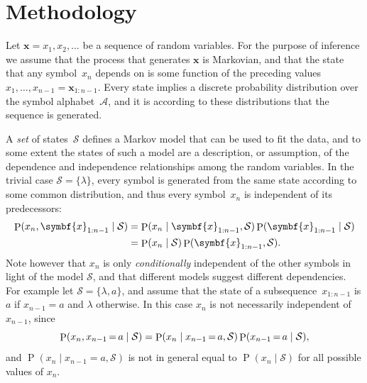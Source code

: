 \documentclass[12pt,a4paper]{article}
\newcommand\mc[1]{\mathcal{#1}}               %
\newcommand\ub[1]{\symbf{#1}}                 %
\DeclareMathOperator\Pb{P}                    %
\DeclarePairedDelimiter\lr{\lparen}{\rparen}  %
\newcommand\peq{\mathop{=}}   %
\begin{document}
\section{Methodology} %

Let \(\ub{x} = x_1, x_2, \dotsc\) be a sequence of random variables. For the
purpose of inference we assume that the process that generates \(\ub{x}\) is
Markovian, and that the state that any symbol~\(x_n\) depends on is some
function of the preceding values~\(x_1, \dots, x_{n-1} = \ub{x}_{1:n-1}\). Every
state implies a discrete probability distribution over the symbol
alphabet~\(\mc{A}\), and it is according to these distributions that the
sequence is generated.


A \emph{set} of states~\(\mc{S}\) defines a Markov model that can be used to fit
the data, and to some extent the states of such a model are a description, or
assumption, of the dependence and independence relationships among the random
variables. In the trivial case \(\mc{S} = \{\lambda\}\), every symbol is
generated from the same state according to some common distribution, and thus
every symbol~\(x_n\) is independent of its predecessors: 
\begin{align*}
  \Pb\lr{x_n, \ub{x}_{1:n-1} \mid \mc{S}} &=
    \Pb\lr{x_n \mid \ub{x}_{1:n-1}, \mc{S}}
    \Pb\lr{\ub{x}_{1:n-1} \mid \mc{S}} \\
  &= \Pb\lr{x_n \mid \mc{S}} \Pb\lr{\ub{x}_{1:n-1}, \mc{S}}.
\end{align*}
Note however that \(x_n\) is only \emph{conditionally} independent of the other
symbols in light of the model \(\mc{S}\), and that different models suggest
different dependencies. For example let \(\mc{S} = \{\lambda, a\}\), and assume
that the state of a subsequence~\(x_{1:n-1}\) is \(a\) if \(x_{n-1} = a\) and
\(\lambda\) otherwise. In this case \(x_n\) is not necessarily independent of
\(x_{n-1}\), since
\begin{equation*}
  \Pb\lr{x_n, x_{n-1} \peq a \mid \mc{S}} =
    \Pb\lr{x_n \mid x_{n-1} \peq a, \mc{S}} \Pb\lr{x_{n-1} \peq a \mid \mc{S}},
\end{equation*}
and \({\Pb(x_n \mid x_{n-1} \peq a, \mc{S})}\) is not in general equal to
\(\Pb(x_n \mid \mc{S})\) for all possible values of \(x_n\).
\end{document}
